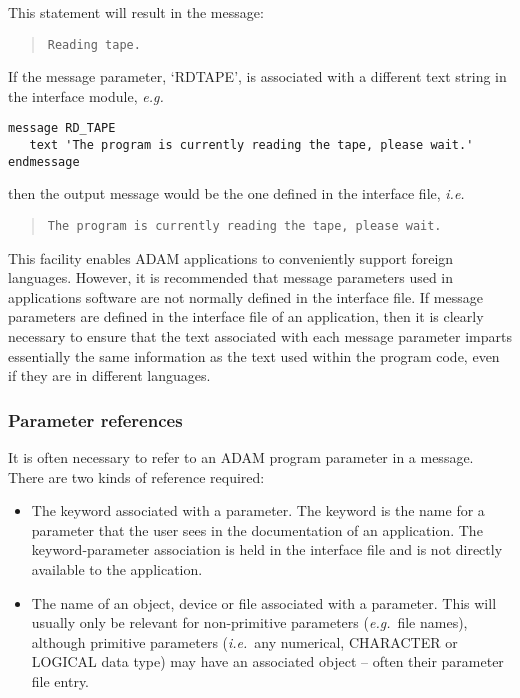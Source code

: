 \documentclass[twoside,11pt]{article}
\newcommand{\xlabel}[1]{}
\renewcommand{\_}{\texttt{\symbol{95}}}
\begin{document}
This statement will result in the message:

\begin {quote}
\begin {small}
\begin{verbatim}
Reading tape.
\end{verbatim}
\end {small}
\end {quote}

If the message parameter, `RD\_TAPE', is associated with a  different text
string in the interface module, \textit{e.g.}

\begin {small}
\begin{verbatim}
message RD_TAPE
   text 'The program is currently reading the tape, please wait.'
endmessage
\end{verbatim}
\end {small}

then the output message would be the one defined in the interface file, {\em
i.e.}

\begin {quote}
\begin {small}
\begin{verbatim}
The program is currently reading the tape, please wait.
\end{verbatim}
\end {small}
\end {quote}

This facility enables ADAM applications to conveniently support foreign
languages. 
However, it is recommended that message parameters used in applications
software are not normally defined in the interface file.
If message parameters are defined in the interface file of an application,
then it is clearly necessary to ensure that the text associated with each
message parameter imparts essentially the same information as the text used
within the program code, even if they are in different languages. 


\subsubsection{\xlabel{parameter_references}Parameter references}

It is often necessary to refer to an ADAM program parameter in a message. 
There are two kinds of reference required: 

\begin {itemize}
\item The keyword associated with a parameter. 
The keyword is the name for a parameter that the user sees in the 
documentation of an application. 
The keyword-parameter association is held in the interface file and is
not directly available to the application. 

\item The name of an object, device or file associated with a parameter. 
This will usually only be relevant for non-primitive parameters 
(\textit{e.g.}\ file names), although primitive parameters (\textit{i.e.}\ any 
numerical, CHARACTER or LOGICAL data type) may have an associated object -- 
often their parameter file entry.
\end {itemize}
\end{document}
